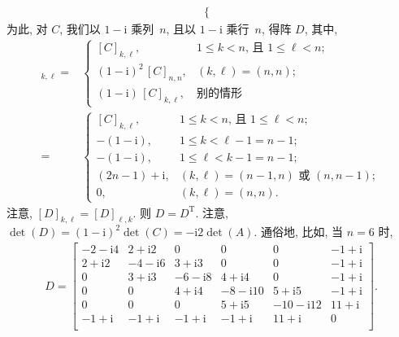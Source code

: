 \documentclass[../libro.tex]{subfiles}
\begin{document}
\begin{example}
\begin{align*}
\begin{cases}
        \end{cases}
    \end{align*}
    为此, 对 \(C\),
    我们以 \(1 - \mathrm{i}\) 乘列~\(n\),
    且以 \(1 - \mathrm{i}\) 乘行~\(n\),
    得阵 \(D\),
    其中,
    \begin{align*}
        [D]_{k,\ell}
        = {} &
        \begin{cases}
            [C]_{k,\ell},                    & \text{\(1 \leq k < n\), 且 \(1 \leq \ell < n\)}; \\
            (1 - \mathrm{i})^2\, [C]_{n,n},  & (k, \ell) = (n, n);                             \\
            (1 - \mathrm{i})\, [C]_{k,\ell}, & \text{别的情形}
        \end{cases}
        \\
        = {} &
        \begin{cases}
            [C]_{k,\ell},          & \text{\(1 \leq k < n\), 且 \(1 \leq \ell < n\)};     \\
            -(1 - \mathrm{i}),     & 1 \leq k < \ell - 1 = n - 1;                        \\
            -(1 - \mathrm{i}),     & 1 \leq \ell < k - 1 = n - 1;                        \\
            (2n - 1) + \mathrm{i}, & \text{\((k, \ell) = (n - 1, n)\) 或 \((n, n - 1)\)}; \\
            0,                     & (k, \ell) = (n, n).
        \end{cases}
    \end{align*}
    注意, \([D]_{k,\ell} = [D]_{\ell,k}\).
    则 \(D = D^{\mathrm{T}}\).
    注意, \(\det {(D)} = (1 - \mathrm{i})^2 \det {(C)}
    = -\mathrm{i} 2 \det {(A)}\).
    通俗地, 比如, 当 \(n = 6\) 时,
    \begin{align*}
        D =
        \begin{bmatrix}
            -2-\mathrm{i}4 & 2+\mathrm{i}2  & 0              & 0               & 0                & -1+\mathrm{i} \\
            2+\mathrm{i}2  & -4-\mathrm{i}6 & 3+\mathrm{i}3  & 0               & 0                & -1+\mathrm{i} \\
            0              & 3+\mathrm{i}3  & -6-\mathrm{i}8 & 4+\mathrm{i}4   & 0                & -1+\mathrm{i} \\
            0              & 0              & 4+\mathrm{i}4  & -8-\mathrm{i}10 & 5+\mathrm{i}5    & -1+\mathrm{i} \\
            0              & 0              & 0              & 5+\mathrm{i}5   & -10-\mathrm{i}12 & 11+\mathrm{i} \\
            -1+\mathrm{i}  & -1+\mathrm{i}  & -1+\mathrm{i}  & -1+\mathrm{i}   & 11+\mathrm{i}    & 0             \\
        \end{bmatrix}.
    \end{align*}


\end{example}
\end{document}
